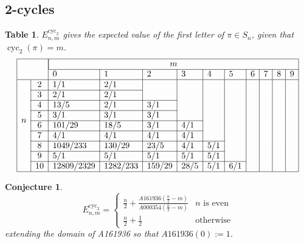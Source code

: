 \documentclass{article}
\newcommand{\n}[1]{\multicolumn{1}{|c|}{#1}}
\newtheorem{conjecture}[theo]{Conjecture}
\newtheorem{datatable}[theo]{Table}
\begin{document}
\subsection{$\boldsymbol{2}$-cycles}
\begin{datatable} $E_{n,m}^{\text{cyc}_2}$ gives the expected value of the first letter of
  $\pi \in S_n$, given that $\operatorname{cyc}_2(\pi) = m$.
\[
  \begin{array}{|ll|l|l|l|l|l|l|l|l|l|l|}
  \hline
  & & \multicolumn{10}{|c|}{m} \\ \cline{3-12}
  & & 0 & 1 & 2 & 3 & 4 & 5 & 6 & 7 & 8 & 9 \\ \hline
  \multirow{8}{*}{$n$}
  & \n{2}  & 1/1      & 2/1    &      &     &     &     &     &     &     & \\ \cline{2-4}
  & \n{3}  & 2/1      & 2/1    &      &     &     &     &     &     &     & \\ \cline{2-5}
  & \n{4}  & 13/5     & 2/1    & 3/1  &     &     &     &     &     &     & \\ \cline{2-5}
  & \n{5}  & 3/1      & 3/1    & 3/1  &     &     &     &     &     &     & \\ \cline{2-6}
  & \n{6}  & 101/29   & 18/5   & 3/1  & 4/1 &     &     &     &     &     & \\ \cline{2-6}
  & \n{7}  & 4/1      & 4/1    & 4/1  & 4/1 &     &     &     &     &     & \\ \cline{2-7}
  & \n{8}  & 1049/233 & 130/29 & 23/5 & 4/1 & 5/1 &     &     &     &     & \\ \cline{2-7}
  & \n{9}  & 5/1      & 5/1    & 5/1  & 5/1 & 5/1 &     &     &     &     & \\ \cline{2-8}
  & \n{10} & 12809/2329 & 1282/233 & 159/29 & 28/5 & 5/1 & 6/1 &&   &     & \\ \hline
  \end{array}
\]
\end{datatable}
\begin{conjecture}
  \[ 
    E_{n,m}^{\text{cyc}_2} = \begin{cases}
      \displaystyle\frac n 2 + \frac{A161936(\frac n2-m)}{A000354(\frac n2-m)} & n \text{ is even}\\
      \displaystyle\frac n 2 + \frac 1 2 & \text{otherwise}
    \end{cases}
  \] extending the domain of A161936 so that $A161936(0) := 1$.
\end{conjecture}
\end{document}
